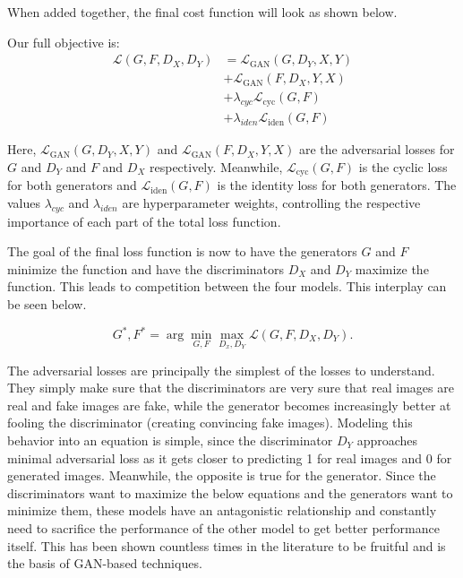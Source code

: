 \documentclass[12pt, fleqn, titlepage]{article}
\begin{document}
When added together, the final cost function will look as shown below.

Our full objective is:
\[\begin{aligned}
	\mathcal{L}\left(G, F, D_{X}, D_{Y}\right) &=\mathcal{L}_{\mathrm{GAN}}\left(G, D_{Y}, X, Y\right) \\
	&+\mathcal{L}_{\mathrm{GAN}}\left(F, D_{X}, Y, X\right) \\
	&+\lambda_{cyc} \mathcal{L}_{\mathrm{cyc}}(G, F) \\
	&+\lambda_{iden} \mathcal{L}_{\mathrm{iden}}(G, F)
\end{aligned}\]

\noindent Here, $\mathcal{L}_{\mathrm{GAN}}\left(G, D_{Y}, X, Y\right)$ and $\mathcal{L}_{\mathrm{GAN}}\left(F, D_{X}, Y, X\right)$ are the adversarial losses for $G$ and $D_Y$ and $F$ and $D_X$ respectively. Meanwhile, $\mathcal{L}_{\mathrm{cyc}}(G, F)$ is the cyclic loss for both generators and $\mathcal{L}_{\mathrm{iden}}(G, F)$ is the identity loss for both generators. The values $\lambda_{cyc}$ and $\lambda_{iden}$ are hyperparameter weights, controlling the respective importance of each part of the total loss function.

The goal of the final loss function is now to have the generators $G$ and $F$ minimize the function and have the discriminators $D_X$ and $D_Y$ maximize the function. This leads to competition between the four models. This interplay can be seen below.

\begin{equation}\label{minimax}
	G^{*}, F^{*}=\arg \min _{G, F} \max _{D_{x}, D_{Y}} \mathcal{L}\left(G, F, D_{X}, D_{Y}\right).
\end{equation}

The adversarial losses are principally the simplest of the losses to understand. They simply make sure that the discriminators are very sure that real images are real and fake images are fake, while the generator becomes increasingly better at fooling the discriminator (creating convincing fake images). Modeling this behavior into an equation is simple, since the discriminator $D_Y$ approaches minimal adversarial loss as it gets closer to predicting 1 for real images and 0 for generated images. Meanwhile, the opposite is true for the generator. Since the discriminators want to maximize the below equations and the generators want to minimize them, these models have an antagonistic relationship and constantly need to sacrifice the performance of the other model to get better performance itself. This has been shown countless times in the literature to be fruitful and is the basis of GAN-based techniques.
\end{document}

